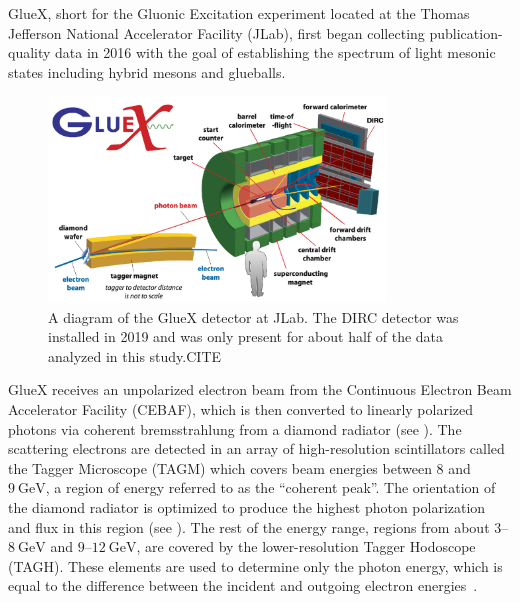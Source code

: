 GlueX, short for the Gluonic Excitation experiment located at the Thomas Jefferson National Accelerator Facility (JLab), first began collecting publication-quality data in 2016 with the goal of establishing the spectrum of light mesonic states including hybrid mesons and glueballs.

\begin{figure}
  \begin{center}
    \includegraphics[width=0.8\textwidth]{figures/gluex_detector.png}
  \end{center}
  \caption{A diagram of the GlueX detector at JLab. The DIRC detector was installed in 2019 and was only present for about half of the data analyzed in this study.{\color{red}CITE}}\label{fig:gluex-detector}
\end{figure}

GlueX receives an unpolarized electron beam from the Continuous Electron Beam Accelerator Facility (CEBAF), which is then converted to linearly polarized photons via coherent bremsstrahlung from a diamond radiator (see ). The scattering electrons are detected in an array of high-resolution scintillators called the Tagger Microscope (TAGM) which covers beam energies between $8$ and $\SI{9}{\giga\eV}$, a region of energy referred to as the ``coherent peak''. The orientation of the diamond radiator is optimized to produce the highest photon polarization and flux in this region (see ). The rest of the energy range, regions from about $3$--$\SI{8}{\giga\eV}$ and $9$--$\SI{12}{\giga\eV}$, are covered by the lower-resolution Tagger Hodoscope (TAGH). These elements are used to determine only the photon energy, which is equal to the difference between the incident and outgoing electron energies~\cite{adhikari_gluex_2021}.



